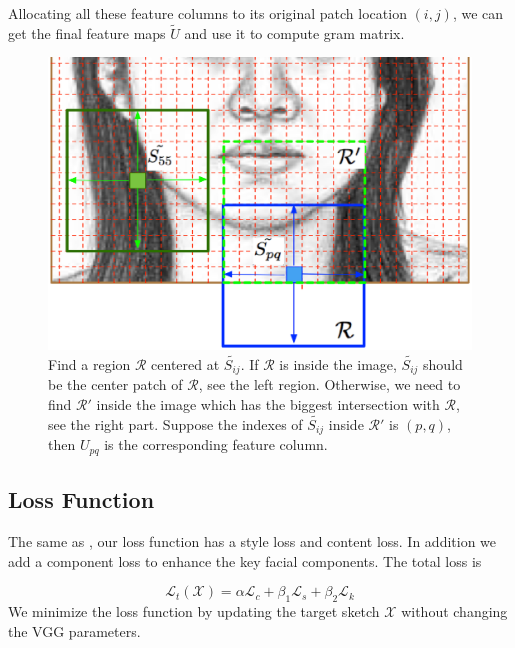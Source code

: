 \documentclass[10pt,twocolumn,letterpaper]{article}
\begin{document}
Allocating all these feature columns to its original patch location $(i, j)$, we can get the final feature maps $\tilde{U}$ and use it to compute gram matrix.  

\begin{figure}[htbp]
\centering
\includegraphics[width=0.99\linewidth]{img/border_PFC.eps}
\caption{Find a region $\mathcal{R}$ centered at $\tilde{S_{ij}}$. If $\mathcal{R}$ is inside the image, $\tilde{S_{ij}}$ should be the center patch of $\mathcal{R}$, see the left region. Otherwise, we need to find $\mathcal{R}'$ inside the image which has the biggest intersection with $\mathcal{R}$, see the right part. Suppose the indexes of $\tilde{S_{ij}}$ inside $\mathcal{R}'$ is $(p, q)$, then $U_{pq}$ is the corresponding feature column.}
\label{fig:border_example}
\end{figure}

\subsection{Loss Function}

The same as \cite{gatys2015neural}, our loss function has a style loss and content loss. In addition we add a component loss to enhance the key facial components. The total loss is

\begin{equation}
\mathcal{L}_{t}( \mathcal{X} ) = \alpha \mathcal{L}_{c} + \beta_1 \mathcal{L}_{s} + \beta_2 \mathcal{L}_{k}
\label{eq:Total_loss}
\end{equation}
We minimize the loss function by updating the target sketch $\mathcal{X}$ without changing the VGG parameters.
\end{document}
